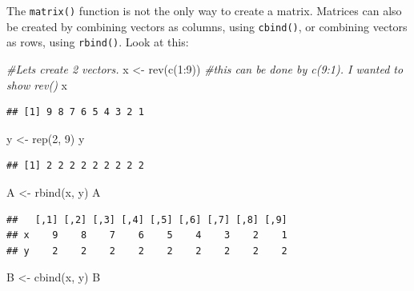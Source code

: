 \documentclass[
]{book}
\newenvironment{Shaded}{\begin{snugshade}}{\end{snugshade}}
\newcommand{\CommentTok}[1]{\textcolor[rgb]{0.56,0.35,0.01}{\textit{#1}}}
\newcommand{\DecValTok}[1]{\textcolor[rgb]{0.00,0.00,0.81}{#1}}
\newcommand{\FunctionTok}[1]{\textcolor[rgb]{0.00,0.00,0.00}{#1}}
\newcommand{\NormalTok}[1]{#1}
\newcommand{\OtherTok}[1]{\textcolor[rgb]{0.56,0.35,0.01}{#1}}
\newcommand{\SpecialCharTok}[1]{\textcolor[rgb]{0.00,0.00,0.00}{#1}}
\theoremstyle{definition}
\theoremstyle{definition}
\theoremstyle{definition}
\theoremstyle{definition}
\theoremstyle{remark}
\begin{document}
The \texttt{matrix()} function is not the only way to create a matrix. Matrices can also be created by combining vectors as columns, using \texttt{cbind()}, or combining vectors as rows, using \texttt{rbind()}. Look at this:

\begin{Shaded}
\begin{Highlighting}[]
\CommentTok{\#Let\textquotesingle{}s create 2 vectors.}
\NormalTok{x }\OtherTok{\textless{}{-}} \FunctionTok{rev}\NormalTok{(}\FunctionTok{c}\NormalTok{(}\DecValTok{1}\SpecialCharTok{:}\DecValTok{9}\NormalTok{))  }\CommentTok{\#this can be done by c(9:1). I wanted to show rev()}
\NormalTok{x}
\end{Highlighting}
\end{Shaded}

\begin{verbatim}
## [1] 9 8 7 6 5 4 3 2 1
\end{verbatim}

\begin{Shaded}
\begin{Highlighting}[]
\NormalTok{y }\OtherTok{\textless{}{-}} \FunctionTok{rep}\NormalTok{(}\DecValTok{2}\NormalTok{, }\DecValTok{9}\NormalTok{)}
\NormalTok{y}
\end{Highlighting}
\end{Shaded}

\begin{verbatim}
## [1] 2 2 2 2 2 2 2 2 2
\end{verbatim}

\begin{Shaded}
\begin{Highlighting}[]
\NormalTok{A }\OtherTok{\textless{}{-}} \FunctionTok{rbind}\NormalTok{(x, y)}
\NormalTok{A}
\end{Highlighting}
\end{Shaded}

\begin{verbatim}
##   [,1] [,2] [,3] [,4] [,5] [,6] [,7] [,8] [,9]
## x    9    8    7    6    5    4    3    2    1
## y    2    2    2    2    2    2    2    2    2
\end{verbatim}

\begin{Shaded}
\begin{Highlighting}[]
\NormalTok{B }\OtherTok{\textless{}{-}} \FunctionTok{cbind}\NormalTok{(x, y)}
\NormalTok{B}
\end{Highlighting}
\end{Shaded}
\end{document}
